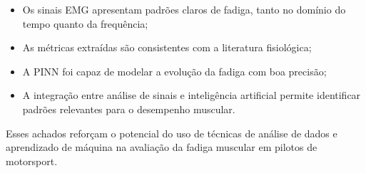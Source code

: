 \documentclass[symbols]{fei}
\begin{document}
\begin{itemize}
    \item Os sinais EMG apresentam padrões claros de fadiga, tanto no domínio do tempo quanto da frequência;
    
    \item As métricas extraídas são consistentes com a literatura fisiológica;
    
    \item A PINN foi capaz de modelar a evolução da fadiga com boa precisão;
    
    \item A integração entre análise de sinais e inteligência artificial permite identificar padrões relevantes para o desempenho muscular.
\end{itemize}

Esses achados reforçam o potencial do uso de técnicas de análise de dados e aprendizado de máquina na avaliação da fadiga muscular em pilotos de motorsport.

\printbibliography
\end{document}
